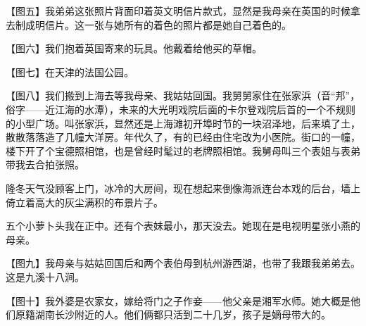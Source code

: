 \par 【图五】我弟弟这张照片背面印着英文明信片款式，显然是我母亲在英国的时候拿去制成明信片。这一张与她所有的着色的照片都是她自己着色的。



\par 【图六】我们抱着英国寄来的玩具。他戴着给他买的草帽。




\par 【图七】在天津的法国公园。




\par 【图八】我们搬到上海去等我母亲、我姑姑回国。我舅舅家住在张家浜（音“邦”，俗字——近江海的水潭），未来的大光明戏院后面的卡尔登戏院后首的一个不规则的小型广场。叫张家浜，显然还是上海滩初开埠时节的一块沼泽地，后来填了土，散散落落造了几幢大洋房。年代久了，有的已经由住宅改为小医院。街口的一幢，楼下开了个宝德照相馆，也是曾经时髦过的老牌照相馆。我舅母叫三个表姐与表弟带我去合拍张照。
\par 隆冬天气没顾客上门，冰冷的大房间，现在想起来倒像海派连台本戏的后台，墙上倚立着高大的灰尘满积的布景片子。
\par 五个小萝卜头我在正中。还有个表妹最小，那天没去。她现在是电视明星张小燕的母亲。



\par 【图九】我母亲与姑姑回国后和两个表伯母到杭州游西湖，也带了我跟我弟弟去。这是九溪十八涧。


\par 【图十】我外婆是农家女，嫁给将门之子作妾——他父亲是湘军水师。她大概是他们原籍湖南长沙附近的人。他们俩都只活到二十几岁，孩子是嫡母带大的。



